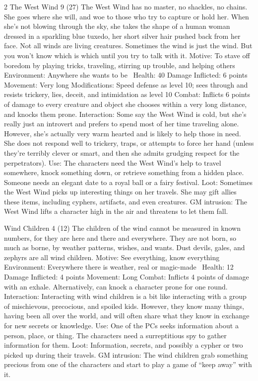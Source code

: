 \begin{multicols}{2}
The West Wind 9 (27)
The West Wind has no master, no shackles, no chains. She goes where she will, and woe to those who try to capture or hold her. When she’s not blowing through the sky, she takes the shape of a human woman dressed in a sparkling blue tuxedo, her short silver hair pushed back from her face.
	Not all winds are living creatures. Sometimes the wind is just the wind. But you won’t know which is which until you try to talk with it.
Motive: To stave off boredom by playing tricks, traveling, stirring up trouble, and helping others
Environment: Anywhere she wants to be 
Health: 40
Damage Inflicted: 6 points
Movement: Very long
Modifications: Speed defense as level 10; sees through and resists trickery, lies, deceit, and intimidation as level 10
Combat: Inflicts 6 points of damage to every creature and object she chooses within a very long distance, and knocks them prone.
Interaction: Some say the West Wind is cold, but she’s really just an introvert and prefers to spend most of her time traveling alone. However, she’s actually very warm hearted and is likely to help those in need. She does not respond well to trickery, traps, or attempts to force her hand (unless they’re terribly clever or smart, and then she admits grudging respect for the perpetrators).
Use: The characters need the West Wind’s help to travel somewhere, knock something down, or retrieve something from a hidden place. Someone needs an elegant date to a royal ball or a fairy festival.
Loot: Sometimes the West Wind picks up interesting things on her travels. She may gift allies these items, including cyphers, artifacts, and even creatures.
GM intrusion: The West Wind lifts a character high in the air and threatens to let them fall.

Wind Children 4 (12)
The children of the wind cannot be measured in known numbers, for they are here and there and everywhere. They are not born, so much as borne, by weather patterns, wishes, and wants. Dust devils, gales, and zephyrs are all wind children.
Motive: See everything, know everything
Environment: Everywhere there is weather, real or magic-made 
Health: 12
Damage Inflicted: 4 points
Movement: Long
Combat: Inflicts 4 points of damage with an exhale. Alternatively, can knock a character prone for one round.
Interaction: Interacting with wind children is a bit like interacting with a group of mischievous, precocious, and spoiled kids. However, they know many things, having been all over the world, and will often share what they know in exchange for new secrets or knowledge.
Use: One of the PCs seeks information about a person, place, or thing. The characters need a surreptitious spy to gather information for them.
Loot: Information, secrets, and possibly a cypher or two picked up during their travels.
GM intrusion: The wind children grab something precious from one of the characters and start to play a game of “keep away” with it.


\end{multicols}
